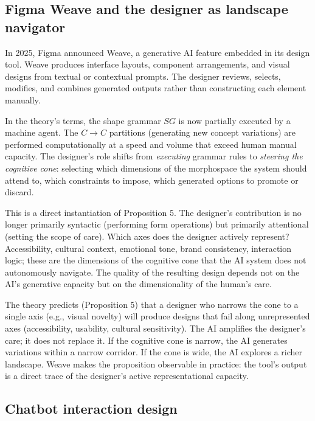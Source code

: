 \subsection{Figma Weave and the designer as landscape navigator}

In 2025, Figma announced Weave, a generative AI feature embedded in its design tool. Weave produces interface layouts, component arrangements, and visual designs from textual or contextual prompts. The designer reviews, selects, modifies, and combines generated outputs rather than constructing each element manually.

In the theory's terms, the shape grammar $SG$ is now partially executed by a machine agent. The $C \to C$ partitions (generating new concept variations) are performed computationally at a speed and volume that exceed human manual capacity. The designer's role shifts from \textit{executing} grammar rules to \textit{steering the cognitive cone}: selecting which dimensions of the morphospace the system should attend to, which constraints to impose, which generated options to promote or discard.

This is a direct instantiation of Proposition 5. The designer's contribution is no longer primarily syntactic (performing form operations) but primarily attentional (setting the scope of care). Which axes does the designer actively represent? Accessibility, cultural context, emotional tone, brand consistency, interaction logic; these are the dimensions of the cognitive cone that the AI system does not autonomously navigate. The quality of the resulting design depends not on the AI's generative capacity but on the dimensionality of the human's care.

The theory predicts (Proposition 5) that a designer who narrows the cone to a single axis (e.g., visual novelty) will produce designs that fail along unrepresented axes (accessibility, usability, cultural sensitivity). The AI amplifies the designer's care; it does not replace it. If the cognitive cone is narrow, the AI generates variations within a narrow corridor. If the cone is wide, the AI explores a richer landscape. Weave makes the proposition observable in practice: the tool's output is a direct trace of the designer's active representational capacity.

\subsection{Chatbot interaction design}


